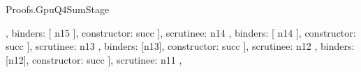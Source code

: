 \begin{lexlean}{Proofs.GpuQ4SumStage}
\begin{semanticmodule}
{{{{{{{{{{{{{{{{{{{{{{{{{{{{{{{{                                                                                            },
                                                                                            binders: [
                                                                                              n15
                                                                                            ],
                                                                                            constructor: succ
                                                                                          }
                                                                                        ],
                                                                                        scrutinee: n14
                                                                                      },
                                                                                      binders: [
                                                                                        n14
                                                                                      ],
                                                                                      constructor: succ
                                                                                    }
                                                                                  ],
                                                                                  scrutinee: n13
                                                                                },
                                                                                binders: [n13],
                                                                                constructor: succ
                                                                              }
                                                                            ],
                                                                            scrutinee: n12
                                                                          },
                                                                          binders: [n12],
                                                                          constructor: succ
                                                                        }
                                                                      ],
                                                                      scrutinee: n11
                                                                    },
}}}}}}}}}}}}}}}}}}}}}}}
\end{semanticmodule}
\end{lexlean}
